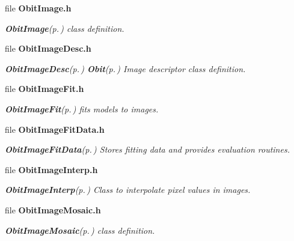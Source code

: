 \begin{CompactItemize}
\item 
file {\bf Obit\-Image.h}
\begin{CompactList}\small\item\em {\bf Obit\-Image}{\rm (p.\,\pageref{structObitImage})} class definition. \item\end{CompactList}

\item 
file {\bf Obit\-Image\-Desc.h}
\begin{CompactList}\small\item\em {\bf Obit\-Image\-Desc}{\rm (p.\,\pageref{structObitImageDesc})} {\bf Obit}{\rm (p.\,\pageref{structObit})} Image descriptor class definition. \item\end{CompactList}

\item 
file {\bf Obit\-Image\-Fit.h}
\begin{CompactList}\small\item\em {\bf Obit\-Image\-Fit}{\rm (p.\,\pageref{structObitImageFit})} fits models to images. \item\end{CompactList}

\item 
file {\bf Obit\-Image\-Fit\-Data.h}
\begin{CompactList}\small\item\em {\bf Obit\-Image\-Fit\-Data}{\rm (p.\,\pageref{structObitImageFitData})} Stores fitting data and provides evaluation routines. \item\end{CompactList}

\item 
file {\bf Obit\-Image\-Interp.h}
\begin{CompactList}\small\item\em {\bf Obit\-Image\-Interp}{\rm (p.\,\pageref{structObitImageInterp})} Class to interpolate pixel values in images. \item\end{CompactList}

\item 
file {\bf Obit\-Image\-Mosaic.h}
\begin{CompactList}\small\item\em {\bf Obit\-Image\-Mosaic}{\rm (p.\,\pageref{structObitImageMosaic})} class definition. \item\end{CompactList}


\end{CompactItemize}
